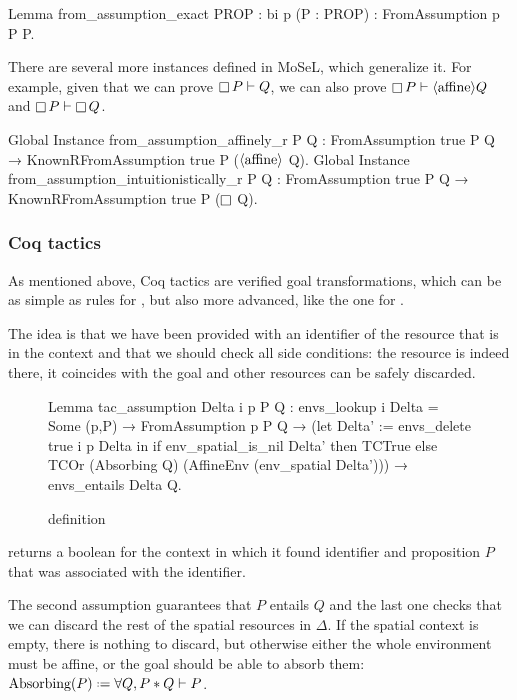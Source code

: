\begin{coq}
Lemma from_assumption_exact {PROP : bi} p (P : PROP) : FromAssumption p P P.
\end{coq}

There are several more instances defined in MoSeL, which generalize it.
For example, given that we can prove \(\mathop{\Box} P \vdash Q\), we can also prove \(\mathop{\Box} P \vdash \langle\text{affine}\rangle Q\) and  \(\mathop{\Box} P \vdash \mathop{\Box} Q\).
\begin{coq}
Global Instance from_assumption_affinely_r P Q :
  FromAssumption true P Q → KnownRFromAssumption true P ($\langle\text{affine}\rangle$ Q).
Global Instance from_assumption_intuitionistically_r P Q :
  FromAssumption true P Q → KnownRFromAssumption true P ($\mathop{\Box}$ Q).
\end{coq}

\subsubsection{Coq tactics}
\label{sec:coq-tactics}

As mentioned above, Coq tactics are verified goal transformations, which can be as simple as rules for , but also more advanced, like the one for .

The idea is that we have been provided with an identifier of the resource that is in the context and that we should check all side conditions: the resource is indeed there, it coincides with the goal and other resources can be safely discarded.

\begin{figure}[H]
\begin{coq}
Lemma tac_assumption Delta i p P Q :
  envs_lookup i Delta = Some (p,P) →
  FromAssumption p P Q →
  (let Delta' := envs_delete true i p Delta in
   if env_spatial_is_nil Delta' then TCTrue
   else TCOr (Absorbing Q) (AffineEnv (env_spatial Delta'))) →
  envs_entails Delta Q.
\end{coq}
\caption{ definition}
\label{fig:tac-assumption}
\end{figure}

 returns a boolean for the context in which it found identifier  and proposition \(P\) that was associated with the identifier.

The second assumption guarantees that \(P\) entails \(Q\) and the last one checks that we can discard the rest of the spatial resources in \(\Delta\).
If the spatial context is empty, there is nothing to discard, but otherwise either the whole environment must be affine, or the goal should be able to absorb them:
\(\Absorbing P \defeq \forall Q, P * Q \vdash P\).

